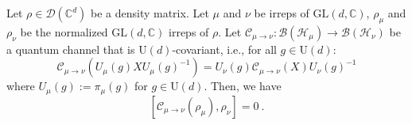 \documentclass[a4paper,onecolumn,11pt]{quantumarticle}
\providecommand{\customgenericname}{}
\newenvironment{mprop}[1]{%
  \renewcommand\customgenericname{Proposition}%
  \renewcommand\theinnercustomgeneric{#1}%
  \innercustomgeneric
}{\endinnercustomgeneric}
\def\h{\mathcal{H}}
\def\C{\mathcal{C}}
\begin{document}

\begin{mprop}{3}[Commutativity] 
Let $\rho \in \mathcal{D}(\mathbb{C}^d)$ be a density matrix. Let $\mu$ and $\nu$ be irreps of $\mathrm{GL}(d,\mathbb C)$, $ \rho_\mu$ and $ \rho_\nu$ be the normalized $\mathrm{GL}(d,\mathbb C)$ irreps of $\rho$.
Let $\C_{\mu \to \nu}: \mathcal{B}(\h_\mu) \to \mathcal{B}(\h_\nu)$ be a quantum channel that is $\mathrm{U}(d)$-covariant, i.e., for all $g \in \mathrm{U}(d)$:
\begin{equation}
    \C_{\mu \to \nu}( U_\mu(g) X U_\mu(g)^{-1} ) = U_\nu(g) \C_{\mu \to \nu}(X) U_\nu(g)^{-1}
\end{equation}
where $U_\mu(g) := \pi_\mu(g)$ for $g \in \mathrm{U}(d)$.
Then, we have
\begin{equation}
    \left[ \C_{\mu \to \nu}(\rho_\mu), \rho_\nu \right] = 0 \ .
\end{equation}
\end{mprop}
\end{document}
